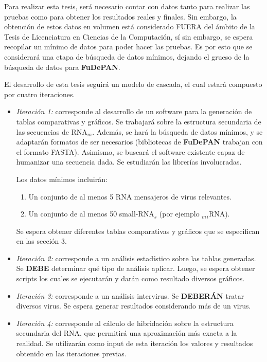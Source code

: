 \documentclass[12pt,a4paper,spanish]{article}
\begin{document}
	\par Para realizar esta tesis, será necesario contar con datos tanto para realizar las pruebas como para obtener los resultados reales y finales.
	Sin embargo, la obtención de estos datos en volumen está considerado FUERA del ámbito de la Tesis de Licenciatura en Ciencias de la Computación, sí 	sin embargo, se espera recopilar un mínimo de datos para poder hacer las pruebas. Es por esto que se considerará una etapa de búsqueda de
	datos mínimos, dejando el grueso de la búsqueda de datos para \textbf{FuDePAN}. 
	\par El desarrollo de esta tesis seguirá un modelo de cascada, el cual estará compuesto por cuatro iteraciones. 
	\begin{itemize}
		\item \textit{Iteración 1:} corresponde al desarrollo de un software para la generación de tablas comparativas y 										gráficos. Se trabajará sobre la estructura secundaria de las secuencias de RNA$_m$. 									Además, se hará la búsqueda de datos mínimos, y se adaptarán formatos de ser 										necesarios (bibliotecas de \textbf{FuDePAN} trabajan con el formato FASTA). Asimismo, 										se buscará el software existente capaz de humanizar una secuencia dada. Se estudiarán 										las librerías involucradas.
									\par Los datos mínimos incluirán:
									\begin{enumerate}
										\item Un conjunto de al menos 5 RNA mensajeros de virus relevantes.
										\item Un conjunto de al menos 50 small-RNA$_s$ (por ejemplo $_m$$_i$RNA).
									\end{enumerate}
									\par Se espera obtener diferentes tablas comparativas y gráficos que se especifican en 										las sección 3. 

		\item \textit{Iteración 2:} corresponde a un análisis estadístico sobre las tablas generadas. Se \textbf{DEBE} 										determinar qué tipo de análisis aplicar. Luego, se espera obtener scripts los cuales 										se ejecutarán y darán como resultado diversos gráficos.

		\item \textit{Iteración 3:} corresponde a un análisis intervirus. Se \textbf{DEBERÁN} tratar diversos virus. Se 									espera generar resultados considerando más de un virus. 

		\item \textit{Iteración 4:} corresponde al cálculo de hibridación sobre la estructura secundaria del RNA, que 										permitirá una aproximación más exacta a la realidad. Se utilizarán como input de esta 										iteración los valores y resultados obtenido en las iteraciones previas.
	\end{itemize}
\end{document}
